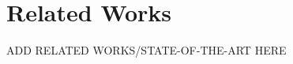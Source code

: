 \documentclass[../main.tex]{subfiles}
\begin{document}
\section{Related Works}
\label{sec:related_works}
ADD RELATED WORKS/STATE-OF-THE-ART HERE \cite{Almeida2023}
\end{document}

